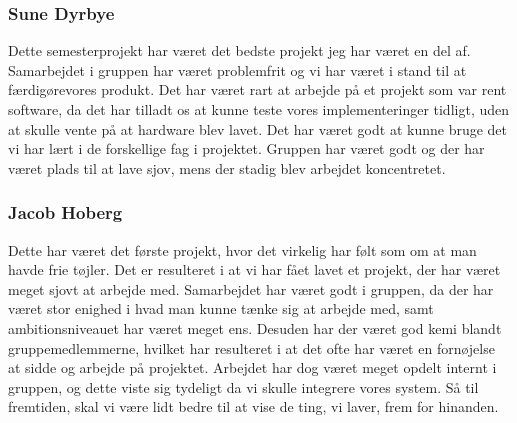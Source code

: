 \subsubsection{Sune Dyrbye}
Dette semesterprojekt har været det bedste projekt jeg har været en del af. Samarbejdet i gruppen har været problemfrit og vi har været i stand til at færdigørevores produkt. Det har været rart at arbejde på et projekt som var rent software, da det har tilladt os at kunne teste vores implementeringer tidligt, uden at skulle vente på at hardware blev lavet. Det har været godt at kunne bruge det vi har lært i de forskellige fag i projektet. Gruppen har været godt og der har været plads til at lave sjov, mens der stadig blev arbejdet koncentretet.

\subsubsection{Jacob Hoberg}
Dette har været det første projekt, hvor det virkelig har følt som om at man havde frie tøjler. Det er resulteret i at vi har fået lavet et projekt, der har været meget sjovt at arbejde med. Samarbejdet har været godt i gruppen, da der har været stor enighed i hvad man kunne tænke sig at arbejde med, samt ambitionsniveauet har været meget ens. Desuden har der været god kemi blandt gruppemedlemmerne, hvilket har resulteret i at det ofte har været en fornøjelse at sidde og arbejde på projektet. Arbejdet har dog været meget opdelt internt i gruppen, og dette viste sig tydeligt da vi skulle integrere vores system. Så til fremtiden, skal vi være lidt bedre til at vise de ting, vi laver, frem for hinanden. 